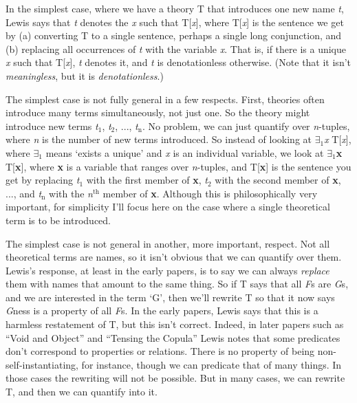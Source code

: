 In the simplest case, where we have a theory T that introduces one new name \textit{t}, Lewis says that \textit{t} denotes the \textit{x} such that T[\textit{x}], where T[\textit{x}] is the sentence we get by (a) converting T to a single sentence, perhaps a single long conjunction, and (b) replacing all occurrences of \textit{t} with the variable \textit{x}. That is, if there is a unique \textit{x} such that T[\textit{x}], \textit{t} denotes it, and \textit{t} is denotationless otherwise. (Note that it isn't \textit{meaningless}, but it is \textit{denotationless}.)

The simplest case is not fully general in a few respects. First, theories often introduce many terms simultaneously, not just one. So the theory might introduce new terms \textit{t}\(_\text{1}\), \textit{t}\(_\text{2}\), ..., \textit{t\(_\text{n}\)}. No problem, we can just quantify over \textit{n}-tuples, where \textit{n} is the number of new terms introduced. So instead of looking at \(\exists\)\(_\text{1}\)\textit{x} T[\textit{x}], where \(\exists\)\(_\text{1}\) means `exists a unique' and \textit{x} is an individual variable, we look at \(\exists\)\(_\text{1}\)\textbf{x} T[\textbf{x}], where \textbf{x} is a variable that ranges over \textit{n}-tuples, and T[\textbf{x}] is the sentence you get by replacing \textit{t}\(_\text{1}\) with the first member of \textbf{x}, \textit{t}\(_\text{2}\) with the second member of \textbf{x}, ..., and \textit{t\(_\text{n}\)} with the \textit{n}\(^\text{th}\) member of \textbf{x}. Although this is philosophically very important, for simplicity I'll focus here on the case where a single theoretical term is to be introduced.

The simplest case is not general in another, more important, respect. Not all theoretical terms are names, so it isn't obvious that we can quantify over them. Lewis's response, at least in the early papers, is to say we can always \textit{replace} them with names that amount to the same thing. So if T says that all \textit{F}s are \textit{G}s, and we are interested in the term `G', then we'll rewrite T so that it now says \textit{G}ness is a property of all \textit{F}s. In the early papers, Lewis says that this is a harmless restatement of T, but this isn't correct. Indeed, in later papers such as ``Void and Object'' \citeyearpar{Lewis2004d} and ``Tensing the Copula'' \citeyearpar{Lewis2002a} Lewis notes that some predicates don't correspond to properties or relations. There is no property of being non-self-instantiating, for instance, though we can predicate that of many things. In those cases the rewriting will not be possible. But in many cases, we can rewrite T, and then we can quantify into it.

